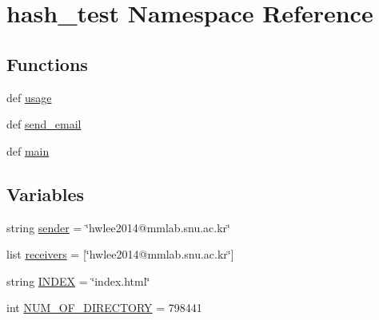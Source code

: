 \hypertarget{namespacehash__test}{\section{hash\-\_\-test Namespace Reference}
\label{namespacehash__test}
}
\subsection*{Functions}
\begin{DoxyCompactItemize}
\item 
def \hyperlink{namespacehash__test_ab51afd961531d16b71d65ed333284b56}{usage}
\item 
def \hyperlink{namespacehash__test_a4682eba06f6a5002046d9ce747323cbb}{send\-\_\-email}
\item 
def \hyperlink{namespacehash__test_a5295847271997f80e6d8c3038be49af9}{main}
\end{DoxyCompactItemize}
\subsection*{Variables}
\begin{DoxyCompactItemize}
\item 
string \hyperlink{namespacehash__test_a44b81fcb8e8f8c20e8041b98b4ddb600}{sender} = \char`\"{}hwlee2014@mmlab.\-snu.\-ac.\-kr\char`\"{}
\item 
list \hyperlink{namespacehash__test_ae898e0fc89510f5d09236d516ee04537}{receivers} = \mbox{[}\char`\"{}hwlee2014@mmlab.\-snu.\-ac.\-kr\char`\"{}\mbox{]}
\item 
string \hyperlink{namespacehash__test_afaac1ce28cb726db1ae789e191ff39e6}{I\-N\-D\-E\-X} = \char`\"{}index.\-html\char`\"{}
\item 
int \hyperlink{namespacehash__test_a81ba1c79694b5fe8a0626d8369dbe7e8}{N\-U\-M\-\_\-\-O\-F\-\_\-\-D\-I\-R\-E\-C\-T\-O\-R\-Y} = 798441
\end{DoxyCompactItemize}


